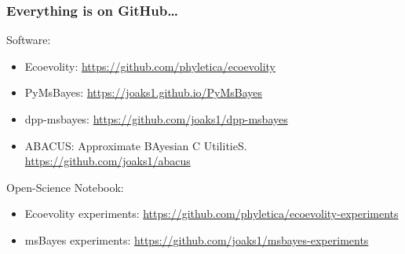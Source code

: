 \begin{frame}
    \frametitle{Everything is on GitHub\ldots}
    Software:\\
    \begin{itemize}
        \item Ecoevolity:
            \url{https://github.com/phyletica/ecoevolity}

        \item PyMsBayes:
            \url{https://joaks1.github.io/PyMsBayes}

        \item dpp-msbayes:
            \url{https://github.com/joaks1/dpp-msbayes}

        \item ABACUS: Approximate BAyesian C UtilitieS.
            \url{https://github.com/joaks1/abacus}
    \end{itemize}

    \medskip
    Open-Science Notebook:\\
    \begin{itemize}
        \item Ecoevolity experiments:
            \url{https://github.com/phyletica/ecoevolity-experiments}
    \end{itemize}
    \begin{itemize}
        \item msBayes experiments:
            \url{https://github.com/joaks1/msbayes-experiments}
    \end{itemize}
\end{frame}
